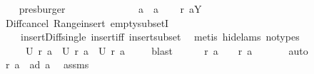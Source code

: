 \begin{isabellebody}
\ {}\ \isamarkupfalse%
\ presburger\isanewline
\ \ \isacommand{{\isacharbraceleft}}\isamarkupfalse%
\ \isanewline
\ \ \ \ \isamarkupfalse%
\isanewline
\ \ \ \ {}{\isacharcolon}\ {\isachardoublequoteopen}{\isacharquery}a{}{\isasymnoteq}{\isacharbraceleft}{\isacharbraceright}\ {\isacharampersand}\ {\isacharquery}a{}{\isasymnoteq}{\isacharbraceleft}{\isacharbraceright}{\isachardoublequoteclose}\ \isamarkupfalse%
\ \isamarkupfalse%
\ {\isachardoublequoteopen}{\isacharquery}r\ {\isacharquery}a{}{\isasymsupseteq}{\isacharbraceleft}{\isacharquery}Y{\isacharbraceright}{\isachardoublequoteclose}\ \isamarkupfalse%
\ Diff{\isacharunderscore}cancel\ Range{\isacharunderscore}insert\ empty{\isacharunderscore}subsetI\ \isanewline
\ \ \ \ insert{\isacharunderscore}Diff{\isacharunderscore}single\ insert{\isacharunderscore}iff\ insert{\isacharunderscore}subset\ \isamarkupfalse%
\ {\isacharparenleft}metis\ {\isacharparenleft}hide{\isacharunderscore}lams{\isacharcomma}\ no{\isacharunderscore}types{\isacharparenright}{\isacharparenright}\ \isamarkupfalse%
\ \isamarkupfalse%
\ \isanewline
\ \ \ \ {}{\isacharcolon}\ {\isachardoublequoteopen}{\isacharquery}U\ {\isacharparenleft}{\isacharquery}r\ a{\isacharparenright}\ {\isacharequal}\ {\isacharquery}U\ {\isacharparenleft}{\isacharquery}r\ {\isacharquery}a{}{\isacharparenright}\ {\isasymunion}\ {\isacharquery}U\ {\isacharparenleft}{\isacharquery}r\ {\isacharquery}a{}{\isacharparenright}{\isachardoublequoteclose}\ \isamarkupfalse%
\ {}\ \isamarkupfalse%
\ blast\isanewline
\ \ \ \ \isamarkupfalse%
\ {\isachardoublequoteopen}{\isacharquery}r\ {\isacharquery}a{}\ {\isasymnoteq}\ {\isacharbraceleft}{\isacharbraceright}\ {\isacharampersand}\ {\isacharquery}r\ {\isacharquery}a{}\ {\isasymnoteq}\ {\isacharbraceleft}{\isacharbraceright}{\isachardoublequoteclose}\ \isamarkupfalse%
\ {}\ \isamarkupfalse%
\ auto\isanewline
\ \ \ \ \isamarkupfalse%
\ \isamarkupfalse%
\ {\isachardoublequoteopen}{\isacharquery}r\ {\isacharquery}a{}\ {\isasymsubseteq}\ a{\isacharbackquote}{\isacharbackquote}{\isacharparenleft}{\isacharquery}d\ {\isacharquery}a{}{\isacharparenright}{\isachardoublequoteclose}\ \isamarkupfalse%
\ assms\ \isamarkupfalse%

\end{isabellebody}
